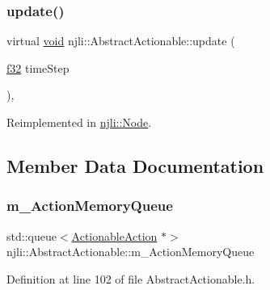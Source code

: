 \mbox{\label{classnjli_1_1_abstract_actionable_aab364e6f121a457e33a61850300c2d7b}} 
\subsubsection{\texorpdfstring{update()}{update()}}
{\footnotesize\ttfamily virtual \mbox{\hyperlink{_thread_8h_af1e856da2e658414cb2456cb6f7ebc66}{void}} njli\+::\+Abstract\+Actionable\+::update (\begin{DoxyParamCaption}\item[{\mbox{\hyperlink{_util_8h_a5f6906312a689f27d70e9d086649d3fd}{f32}}}]{time\+Step }\end{DoxyParamCaption})\hspace{0.3cm}{\ttfamily [protected]}, {\ttfamily [virtual]}}



Reimplemented in \mbox{\hyperlink{classnjli_1_1_node_a3eb1db3aa2681e4acaf3e9e95fd01e69}{njli\+::\+Node}}.



\subsection{Member Data Documentation}
\mbox{\label{classnjli_1_1_abstract_actionable_a230d6ee2c4c2cd3f7d4e716ea238dbfc}} 
\subsubsection{\texorpdfstring{m\+\_\+\+Action\+Memory\+Queue}{m\_ActionMemoryQueue}}
{\footnotesize\ttfamily std\+::queue$<$\mbox{\hyperlink{structnjli_1_1_abstract_actionable_1_1_actionable_action}{Actionable\+Action}} $\ast$$>$ njli\+::\+Abstract\+Actionable\+::m\+\_\+\+Action\+Memory\+Queue\hspace{0.3cm}{\ttfamily [private]}}



Definition at line 102 of file Abstract\+Actionable.\+h.

